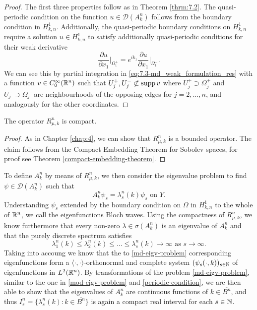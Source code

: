 \begin{proof}
 	The first three properties follow as in Theorem \ref{thrm:7.2}. The quasi-periodic condition on the function $u \in \mathcal{D}(A^{n}_{k})$ follows from the boundary condition in $H^{1}_{k, n}$. Additionally, the quasi-periodic boundary conditions on $H^{1}_{k,n}$ require a solution $u \in H^{1}_{k, n}$ to satisfy additionally quasi-periodic conditions for their weak derivative
 		\[ \frac{\partial u}{\partial x_{1}}\big|_{\Omega_{1}^{+}} = e^{ik_{1}} \frac{\partial u}{\partial x_{1}}\big|_{\Omega_{1}^{-}}. \]
 		We can see this by partial integration in \eqref{eq:7.3-md_weak_formulation_res} with a function $v \in C_{0}^{\infty}(\mathbb{R}^{n})$ such that $U^{+}_{j}, U^{-}_{j} \not\subset \operatorname{supp} v$ where $U^{+}_{j} \supset \Omega_{j}^{+}$ and $U^{-}_{j} \supset \Omega_{j}^{-}$ are neighbourhoods of the opposing edges for $j = 2, \dotsc, n$, and analogously for the other coordinates.
\end{proof}

\begin{theorem}
	The operator $R_{\mu, k}^{n}$ is compact.	

	\begin{proof}
		As in Chapter \ref{chap:4}, we can show that $R_{\mu, k}^{n}$ is a bounded operator. The claim follows from the Compact Embedding Theorem for Sobolev spaces, for proof see Theorem \ref{compact-embedding-theorem}.
	\end{proof}
\end{theorem}

To define $A^{n}_{k}$ by means of $R_{\mu, k}^{n}$, we then consider the eigenvalue problem to find $\psi \in \mathcal{D}(A^{n}_{k})$ such that
	\begin{equation}
		A^{n}_{k} \psi_{s} = \lambda^{n}_{s}(k) \psi_{s} \text{ on } Y. \label{md-eigv-problem}
	\end{equation}
Understanding $\psi_{s}$ extended by the boundary condition on $\Omega$ in $H^{1}_{k, n}$ to the whole of $\mathbb{R}^{n}$, we call the eigenfunctions Bloch waves. Using the compactness of $R_{\mu, k}^{n}$, we know furthermore that every non-zero $\lambda \in \sigma(A_{k}^{n})$ is an eigenvalue of $A_{k}^{n}$ and that the purely discrete spectrum satisfies
	\begin{equation}
		\lambda^{n}_{1}(k) \leq \lambda^{n}_{2}(k) \leq \dotsc \leq \lambda^{n}_{s}(k) \rightarrow \infty \text{ as } s \rightarrow \infty. \label{md-comment-after}
	\end{equation}
Taking into accoung \cite[pages 643 - 645]{evans1998partial} we know that the to \eqref{md-eigv-problem} corresponding eigenfunctions form a $\langle \cdot , \cdot \rangle$-orthonormal and complete system $(\psi_{s}(\cdot, k))_{s \in \mathbb{N}}$ of eigenfunctions in $L^{2}(\mathbb{R}^{n})$. By transformations of the problem \eqref{md-eigv-problem}, similar to the one in \eqref{mod-eigv-problem} and \eqref{periodic-condition}, we are then able to show that the eigenvalues of $A^{n}_{k}$ are continuous functions of $k \in \overline{B^{n}}$, and thus $I^{n}_{s} = \{ \lambda^{n}_{s}(k) : k \in \overline{B^{n}} \}$ is again a compact real interval for each $s \in \mathbb{N}$.
~\\

